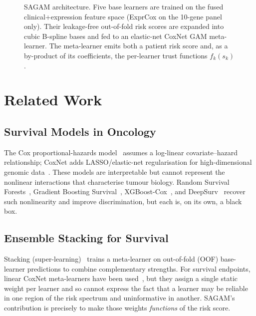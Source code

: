 \documentclass[journal]{IEEEtran}
\begin{document}
\begin{figure}[!t]
{}
\caption{SAGAM architecture. Five base learners are trained on the fused
clinical+expression feature space (ExprCox on the 10-gene panel only). Their
leakage-free out-of-fold risk scores are expanded into cubic B-spline bases and
fed to an elastic-net CoxNet GAM meta-learner. The meta-learner emits both a
patient risk score and, as a by-product of its coefficients, the per-learner
trust functions $f_k(s_k)$.}
\label{fig:arch}
\end{figure}

\section{Related Work}
\label{sec:related}

\subsection{Survival Models in Oncology}
The Cox proportional-hazards model~\cite{cox1972regression} assumes a
log-linear covariate--hazard relationship; CoxNet adds LASSO/elastic-net
regularisation for high-dimensional genomic data~\cite{simon2011regularization}.
These models are interpretable but cannot represent the nonlinear
interactions that characterise tumour biology. Random Survival
Forests~\cite{ishwaran2008random}, Gradient Boosting
Survival~\cite{hothorn2006survival}, XGBoost-Cox~\cite{chen2016xgboost}, and
DeepSurv~\cite{katzman2018deepsurv} recover such nonlinearity and improve
discrimination, but each is, on its own, a black box.

\subsection{Ensemble Stacking for Survival}
Stacking (super-learning)~\cite{van2007super} trains a meta-learner on
out-of-fold (OOF) base-learner predictions to combine complementary strengths.
For survival endpoints, linear CoxNet meta-learners have been
used~\cite{polley2010super}, but they assign a single static weight per
learner and so cannot express the fact that a learner may be reliable in one
region of the risk spectrum and uninformative in another. SAGAM's contribution
is precisely to make those weights \emph{functions} of the risk score.
\end{document}
